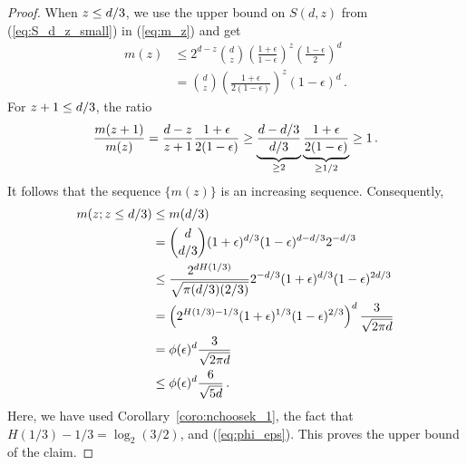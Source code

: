 \begin{proof}
When $z \leq d/3$, we use the upper bound on $S(d,z)$ from (\ref{eq:S_d_z_small}) in (\ref{eq:m_z}) and get
\begin{align*}
m(z)
&\leq 2^{d-z} {d \choose z} \left(\frac{1+\epsilon}{1-\epsilon}\right)^{z} \left(\frac{1-\epsilon}{2}\right)^{d} \\
&= {d \choose z} \left(\frac{1+\epsilon}{2(1-\epsilon)}\right)^{z} (1-\epsilon)^d\,.
\end{align*}
For $z+1 \leq d/3$, the ratio 
\[
\frac{m(z+1)}{m(z)} 
= \frac{d-z}{z+1} \frac{1+\epsilon}{2(1-\epsilon)}
\geq \underbrace{\frac{d-d/3}{d/3}}_{\geq 2} \underbrace{\frac{1+\epsilon}{2(1-\epsilon)}}_{\geq 1/2}
\geq 1\, .
\]
It follows that the sequence $\{m(z)\}$ is an increasing sequence. Consequently,
\begin{align}
m(z; z \leq d/3)
&\leq m(d/3) \nonumber \\
&= {d \choose d/3} (1+\epsilon)^{d/3} (1-\epsilon)^{d- d/3}2^{-d/3} \nonumber \\
&\leq \frac{2^{d H(1/3)}}{\sqrt{\pi (d/3) (2/3)}} 2^{-d/3} (1+\epsilon)^{d/3} (1-\epsilon)^{2d/3} \nonumber \\
&= \left(2^{H(1/3)-1/3} (1+\epsilon)^{1/3} (1-\epsilon)^{2/3} \right)^d \frac{3}{\sqrt{2 \pi d}} \nonumber \\
&= \phi(\epsilon)^d \frac{3}{\sqrt{2 \pi d}} \nonumber \\
&\leq \phi(\epsilon)^d \frac{6}{\sqrt{5 d}} \, . \label{eq:t1star-q1}
\end{align}
Here, we have used Corollary~\ref{coro:nchoosek_1}, the fact that $H(1/3) - 1/3 = \log_2(3/2)$, and (\ref{eq:phi_eps}). This proves the upper bound of the claim. 



\end{proof}
